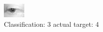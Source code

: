 \begin{figure}[h!]
\begin{center}
\includegraphics[width=0.60\columnwidth]{figures/ID2717_class_3_target_4.png}
\end{center}
\caption{ Classification: 3 actual target: 4}
\label{fig:ID2717_class_3_target_4}
\end{figure}
